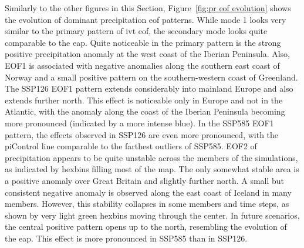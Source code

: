 Similarly to the other figures in this Section, Figure~\ref{fig:pr eof evolution} shows the evolution of dominant precipitation \ac{eof} patterns. 
While mode 1 looks very similar to the primary pattern of \ac{ivt} \ac{eof}, the secondary mode looks quite comparable to the \ac{eap}. 
Quite noticeable in the primary pattern is the strong positive precipitation anomaly at the west coast of the Iberian Peninsula. 
Also, EOF1 is associated with negative anomalies along the southern east coast of Norway and a small positive pattern on the southern-western coast of Greenland. 
The SSP126 EOF1 pattern extends considerably into mainland Europe and also extends further north. 
This effect is noticeable only in Europe and not in the Atlantic, with the anomaly along the coast of the Iberian Peninsula becoming more pronounced (indicated by a more intense blue). 
In the SSP585 EOF1 pattern, the effects observed in SSP126 are even more pronounced, with the piControl line comparable to the farthest outliers of SSP585.
EOF2 of precipitation appears to be quite unstable across the members of the simulations, as indicated by hexbins filling most of the map. The only somewhat stable area is a positive anomaly over Great Britain and slightly further north. A small but consistent negative anomaly is observed along the east coast of Iceland in many members. However, this stability collapses in some members and time steps, as shown by very light green hexbins moving through the center. In future scenarios, the central positive pattern opens up to the north, resembling the evolution of the \ac{eap}. This effect is more pronounced in SSP585 than in SSP126.



